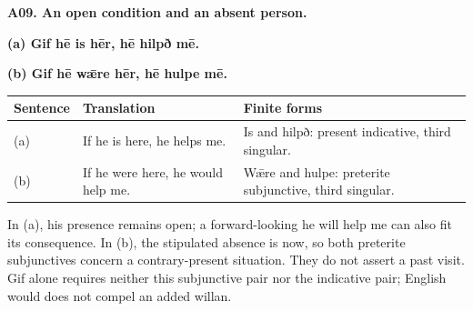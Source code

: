 \par\begin{minipage}{\linewidth}\raggedright
\textbf{A09. An open condition and an absent person.}

\textbf{(a) Gif hē is hēr, hē hilpð mē.}

\textbf{(b) Gif hē wǣre hēr, hē hulpe mē.}

\par\begingroup
\fontsize{10.5}{13.2}\selectfont
\setlength{\LTleft}{0pt}\setlength{\LTright}{\fill}
\noindent
\begin{tabular}{@{}>{\raggedright\arraybackslash}p{19.02mm}>{\raggedright\arraybackslash}p{40.6mm}>{\raggedright\arraybackslash}p{58.76mm}@{}}
\toprule
\textbf{Sentence} & \textbf{Translation} & \textbf{Finite forms} \\
\midrule
(a) & If he is here, he helps me. & Is and hilpð: present indicative, third singular. \\
(b) & If he were here, he would help me. & Wǣre and hulpe: preterite subjunctive, third singular. \\
\bottomrule
\end{tabular}
\par\endgroup

In (a), his presence remains open; a forward-looking he will help me can also fit its consequence. In (b), the stipulated absence is now, so both preterite subjunctives concern a contrary-present situation. They do not assert a past visit. Gif alone requires neither this subjunctive pair nor the indicative pair; English would does not compel an added willan.

\end{minipage}\par\addvspace{4pt}

